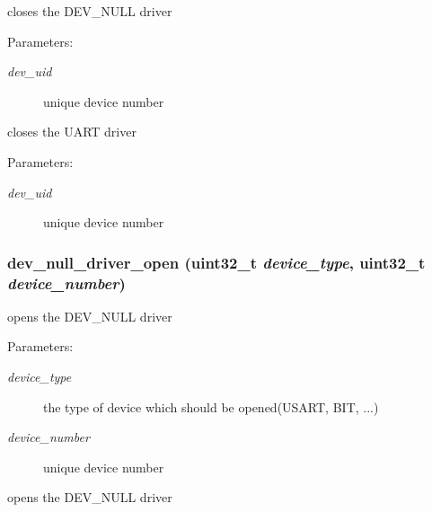 closes the DEV\_\-NULL driver \begin{Desc}
\item[Parameters:]
\begin{description}
\item[{\em dev\_\-uid}]unique device number\end{description}
\end{Desc}
closes the UART driver \begin{Desc}
\item[Parameters:]
\begin{description}
\item[{\em dev\_\-uid}]unique device number \end{description}
\end{Desc}
\hypertarget{group___d_e_v___n_u_l_l___d_r_i_v_e_r_g19420164fed0b4ab3b5c4fc75585b582}{
\subsubsection[{dev\_\-null\_\-driver\_\-open}]{ dev\_\-null\_\-driver\_\-open (uint32\_\-t {\em device\_\-type}, \/  uint32\_\-t {\em device\_\-number})}}
\label{group___d_e_v___n_u_l_l___d_r_i_v_e_r_g19420164fed0b4ab3b5c4fc75585b582}


opens the DEV\_\-NULL driver 

\begin{Desc}
\item[Parameters:]
\begin{description}
\item[{\em device\_\-type}]the type of device which should be opened(USART, BIT, ...) \item[{\em device\_\-number}]unique device number\end{description}
\end{Desc}
opens the DEV\_\-NULL driver

